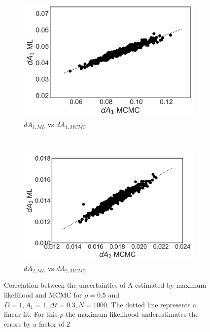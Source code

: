\documentclass[%
 reprint,
 amsmath,amssymb,
 aps,
]{revtex4-1}
\begin{document}
\begin{figure}[H]
    \centering
    \begin{subfigure}[b]{0.4\textwidth}
        \includegraphics[width=\textwidth]{dA1corrkde05.png}
        \caption{$dA_{1,ML}$ vs $dA_{1,MCMC}$}
        \label{fig:A1corr}
    \end{subfigure}
    ~ %
    \begin{subfigure}[b]{0.4\textwidth}
        \includegraphics[width=\textwidth]{dA2corrkde05.png}
        \caption{$dA_{2,ML}$ vs $dA_{2,MCMC}$}
        \label{fig:A2corr}
    \end{subfigure}
    \caption{Correlation between the uncertainties of A estimated by maximum likelihood and MCMC for $\rho=0.5$ and $D=1,A_{1}=1,\Delta t = 0.3,N=1000$.  The dotted line represents a linear fit.  For this $\rho$ the maximum likelihood underestimates the errors by a factor of 2}\label{fig:Acorr}
\end{figure}
\end{document}
